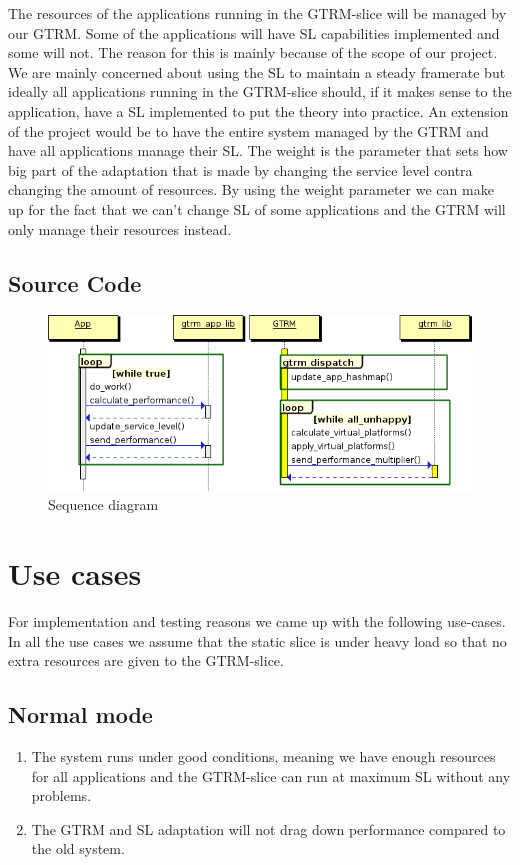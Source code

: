 \documentclass{LTHthesis}
\begin{document}
The resources of the applications running in the GTRM-slice will be managed by our GTRM. Some of the applications will have SL capabilities implemented and some will not. The reason for this is mainly because of the scope of our project. We are mainly concerned about using the SL to maintain a steady framerate but ideally all applications running in the GTRM-slice should, if it makes sense to the application, have a SL implemented to put the theory into practice. An extension of the project would be to have the entire system managed by the GTRM and have all applications manage their SL. The weight is the parameter that sets how big part of the adaptation that is made by changing the service level contra changing the amount of resources. By using the weight parameter we can make up for the fact that we can’t change SL of some applications and the GTRM will only manage their resources instead. 

\section{Source Code}
\begin{figure}
    \centering
    \includegraphics[width=\textwidth]{diag.png}
    \caption{Sequence diagram}
    \label{fig:sdiag}
\end{figure}

\chapter{Use cases}
For implementation and testing reasons we came up with the following use-cases. In all the use cases we assume that the static slice is under heavy load so that no extra resources are given to the GTRM-slice. 
\section{Normal mode}
\begin{enumerate}
\item The system runs under good conditions, meaning we have enough resources for all applications and the GTRM-slice can run at maximum SL without any problems.
\item The GTRM and SL adaptation will not drag down performance compared to the old system.
\end{enumerate}
\end{document}
